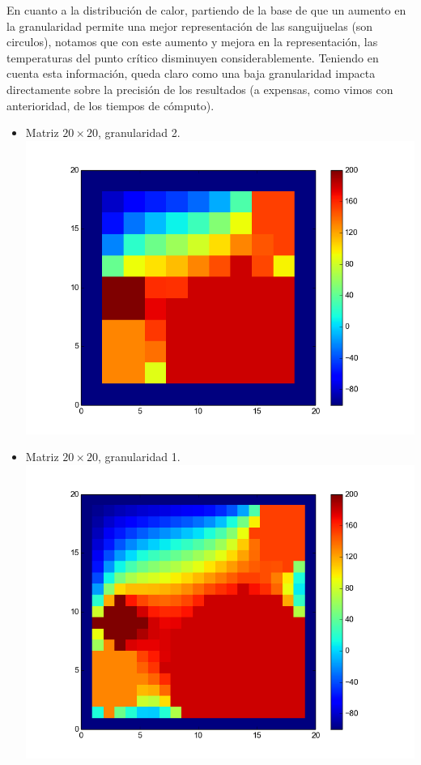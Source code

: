 En cuanto a la distribuci\'on de calor, partiendo de la base de que un aumento en la granularidad permite una mejor representaci\'on de las sanguijuelas (son circulos), notamos que con este aumento y mejora en la representaci\'on, las temperaturas del punto cr\'itico disminuyen considerablemente. Teniendo en cuenta esta informaci\'on, queda claro como una baja granularidad impacta directamente sobre la precisi\'on de los resultados (a expensas, como vimos con anterioridad, de los tiempos de c\'omputo).
\begin{itemize}
 \item Matriz $20 \times 20$, granularidad 2.\\
  \includegraphics[width=400pt]{imagenes/imagen11.png}

 \item Matriz $20 \times 20$, granularidad 1.\\
  \includegraphics[width=400pt]{imagenes/imagen21.png}


\end{itemize}
